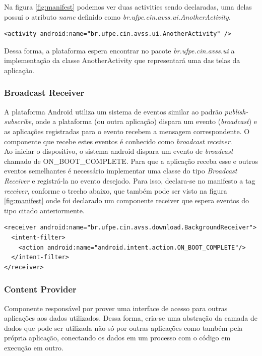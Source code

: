 \documentclass[a4paper,12pt]{article}
\begin{document}
Na figura \ref{fig:manifest} podemos ver duas activities sendo declaradas, uma delas possui o atributo \textit{name} definido como \textit{br.ufpe.cin.avss.ui.AnotherActivity}.
{\fontsize{9pt}{12pt}
\begin{Verbatim}
<activity android:name="br.ufpe.cin.avss.ui.AnotherActivity" />
\end{Verbatim}
}

Dessa forma, a plataforma espera encontrar no pacote \textit{br.ufpe.cin.avss.ui} a implementação da classe AnotherActivity que representará uma das telas da aplicação.

\subsubsection{Broadcast Receiver}

A plataforma Android utiliza um sistema de eventos similar ao padrão \textit{publish-subscribe}, onde a plataforma (ou outra aplicação) dispara um evento (\textit{broadcast}) e as aplicações registradas para o evento recebem a mensagem correspondente. O componente que recebe estes eventos é conhecido como \textit{broadcast receiver}.\\
Ao iniciar o dispositivo, o sistema android dispara um evento de \textit{broadcast} chamado de ON\_BOOT\_COMPLETE. Para que a aplicação receba esse e outros eventos semelhantes é necessário implementar uma classe do tipo \textit{Broadcast Receiver} e registrá-la no evento desejado. Para isso, declara-se no manifesto a tag \textit{receiver}, conforme o trecho abaixo, que também pode ser visto na figura \ref{fig:manifest} onde foi declarado um componente receiver que espera eventos do tipo citado anteriormente.
{\fontsize{9pt}{12pt}
\begin{verbatim}
<receiver android:name="br.ufpe.cin.avss.download.BackgroundReceiver">
  <intent-filter>
    <action android:name="android.intent.action.ON_BOOT_COMPLETE"/>
  </intent-filter>
</receiver>
\end{verbatim}
}

\subsubsection{Content Provider}
\label{sec:provider}
Componente responsável por prover uma interface de acesso para outras aplicações aos dados utilizados. Dessa forma, cria-se uma abstração da camada de dados que pode ser utilizada não só por outras aplicações como também pela própria aplicação, conectando os dados em um processo com o código em execução em outro.\\
\end{document}
